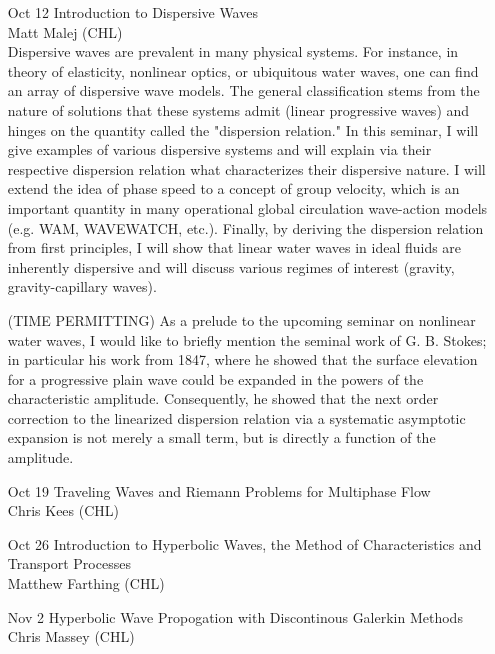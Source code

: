 \documentclass[12]{article}
\begin{document}
\begin{enumerate}

\item[Oct 12] Introduction to Dispersive Waves\\ Matt Malej
  (CHL)\\ Dispersive waves are prevalent in many physical systems.
  For instance, in theory of elasticity, nonlinear optics, or
  ubiquitous water waves, one can find an array of dispersive wave
  models. The general classification stems from the nature of
  solutions that these systems admit (linear progressive waves) and
  hinges on the quantity called the "dispersion relation."  In this
  seminar, I will give examples of various dispersive systems and will
  explain via their respective dispersion relation what characterizes
  their dispersive nature.  I will extend the idea of phase speed to a
  concept of group velocity, which is an important quantity in many
  operational global circulation wave-action models (e.g. WAM,
  WAVEWATCH, etc.). Finally, by deriving the dispersion relation from
  first principles, I will show that linear water waves in ideal
  fluids are inherently dispersive and will discuss various regimes of
  interest (gravity, gravity-capillary waves).

(TIME PERMITTING) As a prelude to the upcoming seminar on nonlinear
  water waves, I would like to briefly mention the seminal work of
  G. B. Stokes; in particular his work from 1847, where he showed that
  the surface elevation for a progressive plain wave could be expanded
  in the powers of the characteristic amplitude. Consequently, he
  showed that the next order correction to the linearized dispersion
  relation via a systematic asymptotic expansion is not merely a small
  term, but is directly a function of the amplitude.

\item[Oct 19] Traveling Waves and Riemann Problems for Multiphase Flow\\
Chris Kees (CHL)\\

\item[Oct 26] Introduction to Hyperbolic Waves, the Method of Characteristics and Transport Processes\\
Matthew Farthing (CHL)\\

\item[Nov 2] Hyperbolic Wave Propogation with Discontinous Galerkin Methods\\
Chris Massey (CHL)\\


\end{enumerate}
\end{document}
